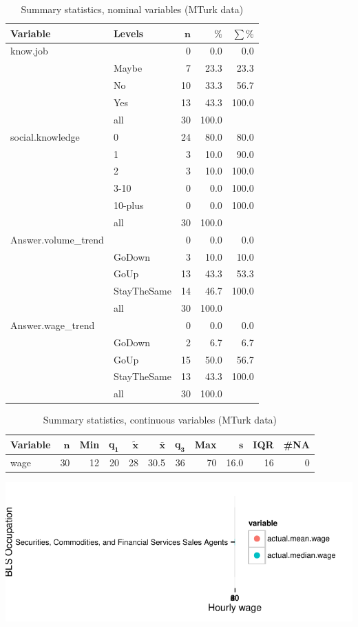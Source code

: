\documentclass[a4paper,10pt]{article}\usepackage[]{graphicx}\usepackage[]{color}
\makeatletter
\def\maxwidth{ %
  \ifdim\Gin@nat@width>\linewidth
    \linewidth
  \else
    \Gin@nat@width
  \fi
}
\makeatother
\begin{document}
\begin{table}[ht]
\centering
{\footnotesize
\begin{tabular}{ll|rrr}
 \textbf{Variable} & \textbf{Levels} & $\mathbf{n}$ & $\mathbf{\%}$ & $\mathbf{\sum \%}$ \\ 
  \hline
know.job &  & 0 & 0.0 & 0.0 \\ 
   & Maybe & 7 & 23.3 & 23.3 \\ 
   & No & 10 & 33.3 & 56.7 \\ 
   & Yes & 13 & 43.3 & 100.0 \\ 
   \hline
 & all & 30 & 100.0 &  \\ 
   \hline
\hline
social.knowledge & 0 & 24 & 80.0 & 80.0 \\ 
   & 1 & 3 & 10.0 & 90.0 \\ 
   & 2 & 3 & 10.0 & 100.0 \\ 
   & 3-10 & 0 & 0.0 & 100.0 \\ 
   & 10-plus & 0 & 0.0 & 100.0 \\ 
   \hline
 & all & 30 & 100.0 &  \\ 
   \hline
\hline
Answer.volume\_trend &  & 0 & 0.0 & 0.0 \\ 
   & GoDown & 3 & 10.0 & 10.0 \\ 
   & GoUp & 13 & 43.3 & 53.3 \\ 
   & StayTheSame & 14 & 46.7 & 100.0 \\ 
   \hline
 & all & 30 & 100.0 &  \\ 
   \hline
\hline
Answer.wage\_trend &  & 0 & 0.0 & 0.0 \\ 
   & GoDown & 2 & 6.7 & 6.7 \\ 
   & GoUp & 15 & 50.0 & 56.7 \\ 
   & StayTheSame & 13 & 43.3 & 100.0 \\ 
   \hline
 & all & 30 & 100.0 &  \\ 
   \hline
\hline
\end{tabular}
}
\caption{Summary statistics, nominal variables (MTurk data)} 
\label{tab1:41-3030}
\end{table}
\begin{table}[ht]
\centering
{\footnotesize
\begin{tabular}{lrrrrrrrrrr}
 \textbf{Variable} & $\mathbf{n}$ & \textbf{Min} & $\mathbf{q_1}$ & $\mathbf{\widetilde{x}}$ & $\mathbf{\bar{x}}$ & $\mathbf{q_3}$ & \textbf{Max} & $\mathbf{s}$ & \textbf{IQR} & \textbf{\#NA} \\ 
  \hline
wage & 30 & 12 & 20 & 28 & 30.5 & 36 & 70 & 16.0 & 16 & 0 \\ 
  \end{tabular}
}
\caption{Summary statistics, continuous variables (MTurk data)} 
\label{tab2:41-3030}
\end{table}


{\centering \includegraphics[width=\maxwidth]{figure/unnamed-chunk-299} 

}


\newpage
\end{document}
